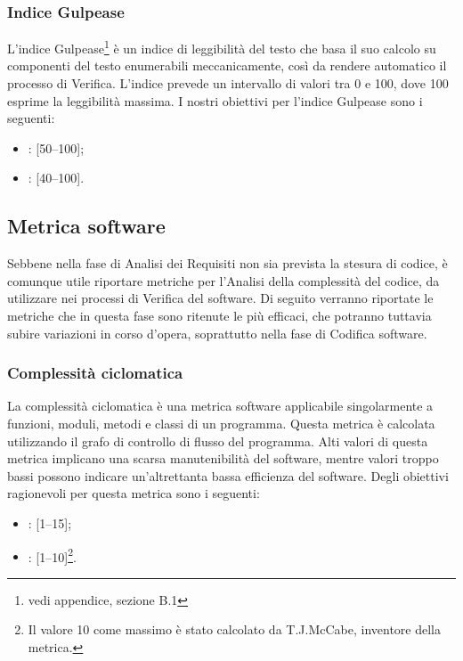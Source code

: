 \subsubsection{Indice Gulpease}
\label{4.1.1}
L'indice Gulpease\footnote{vedi appendice, sezione B.1} è un indice di leggibilità del testo che basa il suo calcolo su componenti del testo enumerabili meccanicamente, così da rendere automatico il processo di Verifica.
L'indice prevede un intervallo di valori tra 0 e 100, dove 100 esprime la leggibilità massima.
I nostri obiettivi per l'indice Gulpease sono i seguenti:
\begin{itemize}
\item {}: [50--100];
\item {}: [40--100].
\end{itemize}

\subsection{Metrica software}
\label{4.2}
Sebbene nella fase di Analisi dei Requisiti non sia prevista la stesura di codice, è comunque utile riportare metriche per l'Analisi della complessità del codice, da utilizzare nei processi di Verifica del software. Di seguito verranno riportate le metriche che in questa fase sono ritenute le più efficaci, che potranno tuttavia subire variazioni in corso d'opera, soprattutto nella fase di Codifica software.

\subsubsection{Complessità ciclomatica}
\label{4.2.1}
La complessità ciclomatica è una metrica software applicabile singolarmente a funzioni, moduli, metodi e classi di un programma.
Questa metrica è calcolata utilizzando il grafo di controllo di flusso del programma.
Alti valori di questa metrica implicano una scarsa manutenibilità del software, mentre valori troppo bassi possono indicare un'altrettanta bassa efficienza del software.
Degli obiettivi ragionevoli per questa metrica sono i seguenti:
\begin{itemize}
\item {}: [1--15];
\item {}: [1--10]\footnote{Il valore 10 come massimo è stato calcolato da T.J.McCabe, inventore della metrica.}.
\end{itemize}

